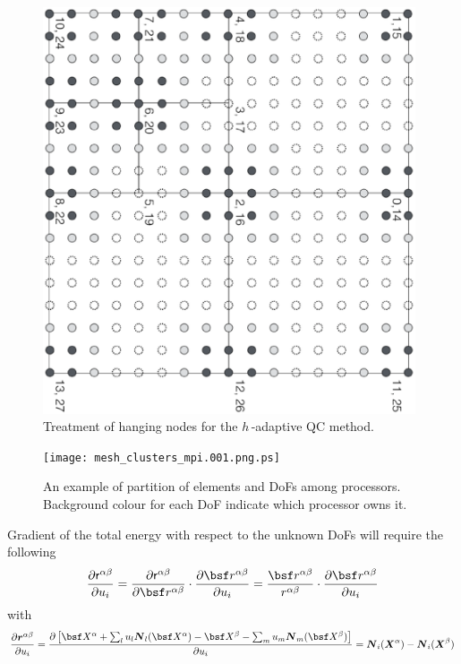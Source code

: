 \documentclass[a4paper,10pt]{article}
\def\gz  #1{           \mbox{\boldmath $\mit #1$}}
\def\msf  #1{           \mbox{\!\!      $\sf #1$}}
\begin{document}
\begin{figure}[!ht]
   \centering
    \includegraphics[angle=90,width=0.98\textwidth]{mesh_clusters.001.png.ps}
    \caption{
        Treatment of hanging nodes for the $h$\,-adaptive QC method.
    }
    \label{fig:mesh_clusters}
\end{figure}

\begin{figure}[!ht]
    \centering
    \texttt{[image: mesh\_clusters\_mpi.001.png.ps]}
    \caption{
        An example of partition of elements and DoFs among processors. Background colour for each DoF indicate which processor owns it.
    }
    \label{fig:mesh_mpi}
\end{figure}


Gradient of the total energy with respect to the unknown DoFs will require the following
\begin{align}
\frac{\partial \msf r^{\alpha \beta}}{\partial u_i} = \frac{\partial \msf r^{\alpha \beta}}{\partial \bsf r^{\alpha\beta}} \cdot \frac{\partial \bsf r^{\alpha\beta}}{\partial u_i} = \frac{\bsf r^{\alpha\beta}}{r^{\alpha\beta}} \cdot \frac{\partial \bsf r^{\alpha\beta}}{\partial u_i}
\end{align}
with
\begin{align}
\frac{\partial \gz r^{\alpha\beta}}{\partial u_i} = \frac{\partial\left[\bsf X^\alpha + \sum_l u_l \gz N_l(\bsf X^\alpha) - \bsf X^\beta - \sum_m u_m \gz N_m(\bsf X^\beta)\right]}{\partial u_i} = \gz N_i (\gz X^\alpha) - \gz N_i (\gz X^\beta)
\end{align}
\end{document}
